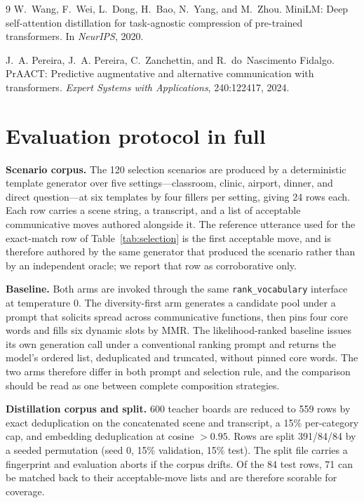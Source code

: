 \begin{thebibliography}{9}
W.~Wang, F.~Wei, L.~Dong, H.~Bao, N.~Yang, and M.~Zhou.
\newblock MiniLM: Deep self-attention distillation for task-agnostic compression
of pre-trained transformers.
\newblock In \emph{NeurIPS}, 2020.

J.~A. Pereira, J.~A. Pereira, C.~Zanchettin, and R.~do~Nascimento Fidalgo.
\newblock PrAACT: Predictive augmentative and alternative communication with
transformers.
\newblock \emph{Expert Systems with Applications}, 240:122417, 2024.

\end{thebibliography}

\appendix

\section{Evaluation protocol in full}\label{app:protocol}

\textbf{Scenario corpus.} The 120 selection scenarios are produced by a
deterministic template generator over five settings---classroom, clinic,
airport, dinner, and direct question---at six templates by four fillers per
setting, giving 24 rows each. Each row carries a scene string, a transcript, and
a list of acceptable communicative moves authored alongside it. The reference
utterance used for the exact-match row of Table~\ref{tab:selection} is the first
acceptable move, and is therefore authored by the same generator that produced
the scenario rather than by an independent oracle; we report that row as
corroborative only.

\textbf{Baseline.} Both arms are invoked through the same
\texttt{rank\_vocabulary} interface at temperature 0. The diversity-first arm
generates a candidate pool under a prompt that solicits spread across
communicative functions, then pins four core words and fills six dynamic slots
by MMR. The likelihood-ranked baseline issues its own generation call under a
conventional ranking prompt and returns the model's ordered list, deduplicated
and truncated, without pinned core words. The two arms therefore differ in both
prompt and selection rule, and the comparison should be read as one between
complete composition strategies.

\textbf{Distillation corpus and split.} 600 teacher boards are reduced to 559
rows by exact deduplication on the concatenated scene and transcript, a 15\%
per-category cap, and embedding deduplication at cosine ${>}0.95$. Rows are
split 391/84/84 by a seeded permutation (seed 0, 15\% validation, 15\% test).
The split file carries a fingerprint and evaluation aborts if the corpus drifts.
Of the 84 test rows, 71 can be matched back to their acceptable-move lists and
are therefore scorable for coverage.

